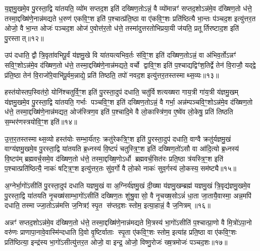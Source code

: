 य॒ज्ञ॒मु॒खमे॒व पु॒रस्ता॒द्वि या॑तयति॒ व्यो॑म सप्तद॒श इति॑ दख्षिण॒तोऽन्नं॒ वै व्यो॑मान्नꣳ॑ सप्तद॒शोऽन्न॑मे॒व द॑ख्षिण॒तो ध॑त्ते॒ तस्मा॒द्दख्षि॑णे॒नान्न॑मद्यते ध॒रुण॑ एकवि॒ꣳ॒श इति॑ प॒श्चात्प्र॑ति॒ष्ठा वा ए॑कवि॒ꣳ॒शः प्रति॑ष्ठित्यै भा॒न्तः प॑ञ्चद॒श इत्यु॑त्तर॒त ओजो॒ वै भा॒न्त ओजः॑ पञ्चद॒श ओज॑ ए॒वोत्त॑र॒तो ध॑त्ते॒ तस्मा॑दुत्तरतोभिप्रया॒यी ज॑यति॒ प्रतूर्तिरष्टाद॒श इति॑ पु॒रस्तात्॥१२॥

उप॑ दधाति॒ द्वौ त्रि॒वृता॑वभिपू॒र्वं य॑ज्ञमु॒खे वि या॑तयत्यभिव॒र्तः स॑वि॒ꣳ॒श इति॑ दख्षिण॒तोऽन्नं॒ वा अ॑भिव॒र्तोऽन्नꣳ॑ सवि॒ꣳ॒शोऽन्न॑मे॒व द॑ख्षिण॒तो ध॑त्ते॒ तस्मा॒द्दख्षि॑णे॒नान्न॑मद्यते॒ वर्चो द्वावि॒ꣳ॒श इति॑ प॒श्चाद्यद्विꣳ॑श॒तिर्द्वे तेन॑ वि॒राजौ॒ यद्द्वे प्र॑ति॒ष्ठा तेन॑ वि॒राजो॑रे॒वाभि॑पू॒र्वम॒न्नाद्ये॒ प्रति॑ तिष्ठति॒ तपो॑ नवद॒श इत्यु॑त्तर॒तस्तस्माथ्स॒व्यः॥१३॥

हस्त॑योस्तप॒स्वित॑रो॒ योनि॑श्चतुर्वि॒ꣳ॒श इति॑ पु॒रस्ता॒दुप॑ दधाति॒ चतु॑र्विशत्यख्षरा गाय॒त्री गा॑य॒त्री य॑ज्ञमु॒खम् य॑ज्ञमु॒खमे॒व पु॒रस्ता॒द्वि या॑तयति॒ गर्भाः पञ्चवि॒ꣳ॒श इति॑ दख्षिण॒तोऽन्नं॒ वै गर्भा॒ अन्न॑म्पञ्चवि॒ꣳ॒शोऽन्न॑मे॒व द॑ख्षिण॒तो ध॑त्ते॒ तस्मा॒द्दख्षि॑णे॒नान्न॑मद्यत॒ ओज॑स्त्रिण॒व इति॑ प॒श्चादि॒मे वै लो॒कास्त्रि॑ण॒व ए॒ष्वे॑व लो॒केषु॒ प्रति॑ तिष्ठति स॒म्भर॑णस्त्रयोवि॒ꣳ॒श इति॑॥१४॥

उ॒त्त॒र॒तस्तस्माथ्स॒व्यो हस्त॑योः सम्भा॒र्य॑तरः॒ क्रतु॑रेकत्रि॒ꣳ॒श इति॑ पु॒रस्ता॒दुप॑ दधाति॒ वाग्वै क्रतु॑र्यज्ञमु॒खं वाग्य॑ज्ञमु॒खमे॒व पु॒रस्ता॒द्वि या॑तयति ब्र॒ध्नस्य॑ वि॒ष्टपं॑ चतुस्त्रि॒ꣳ॒श इति॑ दख्षिण॒तो॑ऽसौ वा आ॑दि॒त्यो ब्र॒ध्नस्य॑ वि॒ष्टप॑म् ब्रह्मवर्च॒समे॒व द॑ख्षिण॒तो ध॑त्ते॒ तस्मा॒द्दख्षि॒णोऽर्धो ब्रह्मवर्च॒सित॑रः प्रति॒ष्ठा त्र॑यस्त्रि॒ꣳ॒श इति॑ प॒श्चात्प्रति॑ष्ठित्यै॒ नाकः॑ षट्त्रि॒ꣳ॒श इत्यु॑त्तर॒तः सु॑व॒र्गो वै लो॒को नाकः॑ सुव॒र्गस्य॑ लो॒कस्य॒ सम॑ष्ट्यै॥१५॥

{\anuvakamend[{वै त्रि॒वृदिति॑ पु॒रस्ताथ्स॒व्यस्त्र॑योवि॒ꣳ॒श इति॑ सुव॒र्गो वै पञ्च॑ च॥३॥ आ॒शुर्व्यो॑म ध॒रुणो॑ भा॒न्तः प्रतूर्तिरभिव॒र्तो वर्च॒स्तपो॒ योनि॒र्गर्भा॒ ओज॑स्स॒म्भर॑णः॒ क्रतु॑र्ब्र॒ध्नस्य॑ प्रति॒ष्ठा नाक॒ष्षोड॑श॥}]}

अ॒ग्नेर्भा॒गो॑ऽसीति॑ पु॒रस्ता॒दुप॑ दधाति यज्ञमु॒खं वा अ॒ग्निर्य॑ज्ञमु॒खं दी॒ख्षा य॑ज्ञमु॒खम्ब्रह्म॑ यज्ञमु॒खं त्रि॒वृद्य॑ज्ञमु॒खमे॒व पु॒रस्ता॒द्वि या॑तयति नृ॒चख्ष॑साम्भा॒गो॑ऽसीति॑ दख्षिण॒तः शु॑श्रु॒वासो॒ वै नृ॒चख्ष॒सोऽन्नं॑ धा॒ता जा॒तायै॒वास्मा॒ अन्न॒मपि॑ दधाति॒ तस्माज्जा॒तोऽन्न॑मत्ति ज॒नित्रꣵ॑ स्पृ॒त स॑प्तद॒शः स्तोम॒ इत्या॒हान्नं॒ वै ज॒नित्रम्॥१६॥

अन्नꣳ॑ सप्तद॒शोऽन्न॑मे॒व द॑ख्षिण॒तो ध॑त्ते॒ तस्मा॒द्दख्षि॑णे॒नान्न॑मद्यते मि॒त्रस्य॑ भा॒गो॑ऽसीति॑ प॒श्चात्प्रा॒णो वै मि॒त्रो॑ऽपा॒नो वरु॑णः प्राणापा॒नावे॒वास्मि॑न्दधाति दि॒वो वृ॒ष्टिर्वाताः स्पृ॒ता ए॑कवि॒ꣳ॒शः स्तोम॒ इत्या॑ह प्रति॒ष्ठा वा ए॑कवि॒ꣳ॒शः प्रति॑ष्ठित्या॒ इन्द्र॑स्य भा॒गो॑ऽसीत्यु॑त्तर॒त ओजो॒ वा इन्द्र॒ ओजो॒ विष्णु॒रोजः॑ ख्ष॒त्रमोजः॑ पञ्चद॒शः॥१७॥

